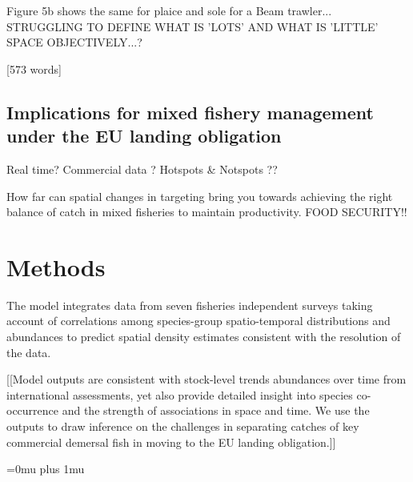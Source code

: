 \documentclass{nature}
\begin{document}
\begin{linenumbers}
Figure 5b shows the same for plaice and sole for a Beam trawler...
STRUGGLING TO DEFINE WHAT IS 'LOTS' AND WHAT IS 'LITTLE' SPACE OBJECTIVELY...?

[573 words]

\subsection{Implications for mixed fishery management under the EU landing
	obligation}



Real time?  Commercial data ?  Hotspots \& Notspots ??

How far can spatial changes in targeting bring you towards achieving the right
balance of catch in mixed fisheries to maintain productivity. FOOD SECURITY!!

\section*{Methods}



The model integrates data from seven fisheries independent surveys taking
account of correlations among species-group spatio-temporal distributions and
abundances to predict spatial density estimates consistent with the resolution
of the data. 

[[Model outputs are consistent with stock-level trends abundances over time
from international assessments, yet also provide detailed insight into species
co-occurrence and the strength of associations in space and time.  We use the
outputs to draw inference on the challenges in separating catches of key
commercial demersal fish in moving to the EU landing obligation.]]



\end{linenumbers}
\newpage
\Urlmuskip=0mu plus 1mu\relax

\small{}



\end{document}
